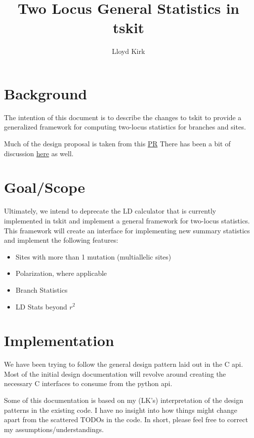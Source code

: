 \documentclass[12pt]{article}
\title{Two Locus General Statistics in tskit}
\author{Lloyd Kirk}
\begin{document}
\maketitle

\section{Background}

The intention of this document is to describe the changes to tskit to provide a
generalized framework for computing two-locus statistics for branches and sites.

Much of the design proposal is taken from this
\href{https://github.com/tskit-dev/tskit/pull/432}{PR} There has been a bit of
discussion \href{https://github.com/tskit-dev/tskit/issues/1900}{here} as well.

\section{Goal/Scope}

Ultimately, we intend to deprecate the LD calculator that is currently
implemented in tskit and implement a general framework for two-locus
statistics. This framework will create an interface for implementing new summary
statistics and implement the following features:

\begin{itemize}
  \item Sites with more than 1 mutation (multiallelic sites)
  \item Polarization, where applicable
  \item Branch Statistics
  \item LD Stats beyond $r^{2}$
\end{itemize}

\section{Implementation}
We have been trying to follow the general design pattern laid out in the C
api. Most of the initial design documentation will revolve around creating the
necessary C interfaces to consume from the python api.

Some of this documentation is based on my (LK’s) interpretation of the design
patterns in the existing code. I have no insight into how things might change
apart from the scattered TODOs in the code. In short, please feel free to
correct my assumptions/understandings.
\end{document}
